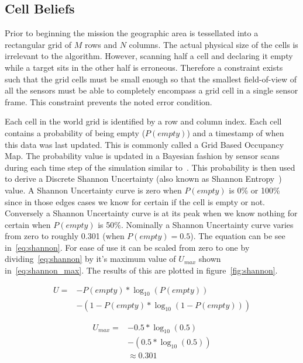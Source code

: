 \subsection{Cell Beliefs}
Prior to beginning the mission the geographic area is tessellated into a rectangular grid of $M$ rows and $N$ columns.  The actual physical size of the cells is irrelevant to the algorithm.  However, scanning half a cell and declaring it empty while a target sits in the other half is erroneous.  Therefore a constraint exists such that the grid cells must be small enough so that the smallest field-of-view of all the sensors must be able to completely encompass a grid cell in a single sensor frame.  This constraint prevents the noted error condition.

Each cell in the world grid is identified by a row and column index.  Each cell contains a probability of being empty ($P(empty)$) and a timestamp of when this data was last updated.  This is commonly called a Grid Based Occupancy Map. The probability value is updated in a Bayesian fashion by sensor scans during each time step of the simulation similar to~\cite{waharte}.  This probability is then used to derive a Discrete Shannon Uncertainty (also known as Shannon Entropy~\cite{shannon}) value.  A Shannon Uncertainty curve is zero when $P(empty)$ is 0\% or 100\% since in those edges cases we know for certain if the cell is empty or not.  Conversely a Shannon Uncertainty curve is at its peak when we know nothing for certain when $P(empty)$ is 50\%.  Nominally a Shannon Uncertainty curve varies from zero to roughly 0.301 (when $P(empty) = 0.5$).  The equation can be see in~\ref{eq:shannon}.  For ease of use it can be scaled from zero to one by dividing~\ref{eq:shannon} by it's maximum value of $U_{max}$ shown in~\ref{eq:shannon_max}.  The results of this are plotted in figure~\ref{fig:shannon}.

\begin{equation}
	\label{eq:shannon}
	\begin{split}
		U = & -P(empty) * \log_{10}(P(empty)) \\
            & - ( 1-P(empty) * \log_{10}(1-P(empty)))
	\end{split}
\end{equation}

\begin{equation}
	\label{eq:shannon_max}
	\begin{split}
		U_{max} = & -0.5 * \log_{10}(0.5) \\
		          & - (0.5 * \log_{10}(0.5)) \\
		          & \approx 0.301
	\end{split}
\end{equation}


